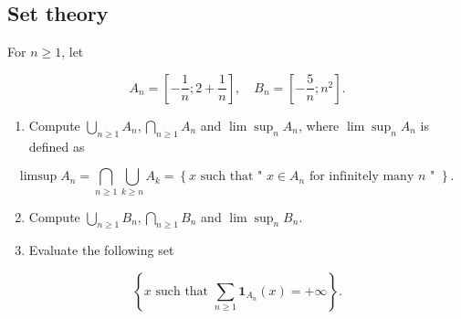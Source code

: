 \begin{center}
  \section*{Set theory}
\end{center}

\begin{Exercise}
  For $n \geq 1$, let

  $$
    A_{n}=\left[-\frac{1}{n} ; 2+\frac{1}{n}\right], \quad B_{n}=\left[-\frac{5}{n} ; n^{2}\right] .
  $$

  \begin{enumerate}
    \item Compute $\bigcup_{n \geq 1} A_{n}, \bigcap_{n \geq 1} A_{n}$ and $\lim \sup _{n} A_{n}$, where $\lim \sup _{n} A_{n}$ is defined as
  \end{enumerate}

  $$
    \limsup A_{n}=\bigcap_{n \geq 1} \bigcup_{k \geq n} A_{k}=\left\{x \text { such that " } x \in A_{n} \text { for infinitely many } n \text { " }\right\} \text {. }
  $$

  \begin{enumerate}
    \setcounter{enumi}{1}
    \item Compute $\bigcup_{n \geq 1} B_{n}, \bigcap_{n \geq 1} B_{n}$ and $\lim \sup _{n} B_{n}$.

    \item Evaluate the following set

  \end{enumerate}

  $$
    \left\{x \text { such that } \sum_{n \geq 1} \mathbf{1}_{A_{n}}(x)=+\infty\right\} .
  $$
\end{Exercise}